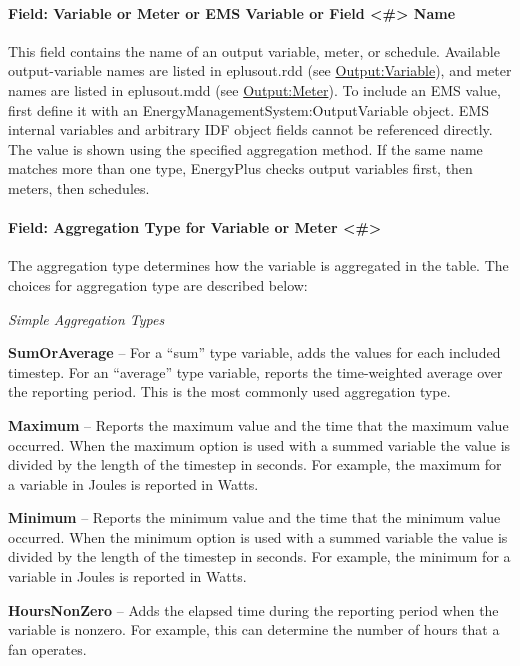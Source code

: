 \paragraph{Field: Variable or Meter or EMS Variable or Field \textless{}\#\textgreater{} Name}\label{field-variable-or-meter-name}

This field contains the name of an output variable, meter, or schedule. Available output-variable names are listed in eplusout.rdd (see \hyperref[outputvariable]{Output:Variable}), and meter names are listed in eplusout.mdd (see \hyperref[outputmeter-and-outputmetermeterfileonly]{Output:Meter}). To include an EMS value, first define it with an EnergyManagementSystem:OutputVariable object. EMS internal variables and arbitrary IDF object fields cannot be referenced directly. The value is shown using the specified aggregation method. If the same name matches more than one type, EnergyPlus checks output variables first, then meters, then schedules.

\paragraph{Field: Aggregation Type for Variable or Meter \textless{}\#\textgreater{}}\label{field-aggregation-type-for-variable-or-meter}

The aggregation type determines how the variable is aggregated in the table. The choices for aggregation type are described below:

\emph{Simple Aggregation Types}

\textbf{SumOrAverage} -- For a ``sum'' type variable, adds the values for each included timestep. For an ``average'' type variable, reports the time-weighted average over the reporting period. This is the most commonly used aggregation type.

\textbf{Maximum} -- Reports the maximum value and the time that the maximum value occurred. When the maximum option is used with a summed variable the value is divided by the length of the timestep in seconds. For example, the maximum for a variable in Joules is reported in Watts.

\textbf{Minimum} -- Reports the minimum value and the time that the minimum value occurred. When the minimum option is used with a summed variable the value is divided by the length of the timestep in seconds. For example, the minimum for a variable in Joules is reported in Watts.

\textbf{HoursNonZero} -- Adds the elapsed time during the reporting period when the variable is nonzero. For example, this can determine the number of hours that a fan operates.

